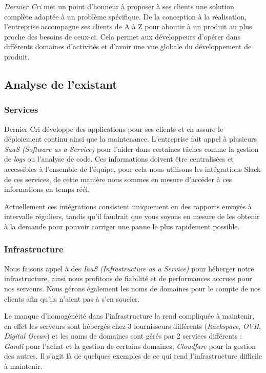\bigskip

\emph{Dernier Cri} met un point d'honneur à proposer à ses clients une
solution complète adaptée à un problème spécifique. De la conception à
la réalisation, l'entreprise accompagne ses clients de A à Z pour
aboutir à un produit au plus proche des besoins de ceux-ci. Cela permet
aux développeurs d'opérer dans différents domaines d'activités et
d'avoir une vue globale du développement de produit.

\newpage

\subsection{Analyse de l'existant}\label{analyse-de-lexistant}

\subsubsection{Services}\label{services}

Dernier Cri développe des applications pour ses clients et en assure le
déploiement continu ainsi que la maintenance. L'entreprise fait appel à
plusieurs \emph{SaaS} \emph{(Software as a Service)} pour l'aider dans
certaines tâches comme la gestion de \emph{logs} ou l'analyse de code.
Ces informations doivent être centralisées et accessibles à l'ensemble
de l'équipe, pour cela nous utilisons les intégrations Slack de ces
services, de cette manière nous sommes en mesure d'accéder à ces
informations en temps réél.

\bigskip

Actuellement ces intégrations consistent uniquement en des rapports
envoyés à intervalle réguliers, tandis qu'il faudrait que vous soyons en
mesure de les obtenir à la demande pour pouvoir corriger une panne le
plus rapidement possible.

\subsubsection{Infrastructure}\label{infrastructure}

Nous faisons appel à des \emph{IaaS} \emph{(Infrastructure as a
Service)} pour héberger notre infrastructure, ainsi nous profitons de
fiabilité et de performances accrues pour nos serveurs. Nous gérons
également les noms de domaines pour le compte de nos clients afin qu'ils
n'aient pas à s'en soucier.

\bigskip

Le manque d'homogénéité dans l'infrastructure la rend compliquée à
maintenir, en effet les serveurs sont hébergés chez 3 fournisseurs
différents (\emph{Rackspace}, \emph{OVH}, \emph{Digital Ocean}) et les
noms de domaines sont gérés par 2 services différents : \emph{Gandi}
pour l'achat et la gestion de certains domaines, \emph{Cloudfare} pour
la gestion des autres. Il s'agit là de quelques exemples de ce qui rend
l'infrastructure difficile à maintenir.

